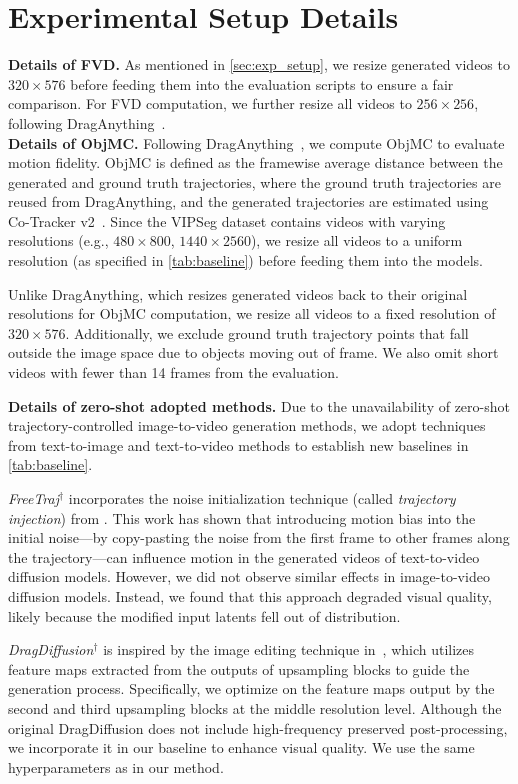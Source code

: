 \section{Experimental Setup Details}
\textbf{Details of FVD.} As mentioned in \cref{sec:exp_setup}, we resize generated videos to $320 \times 576$ before feeding them into the evaluation scripts to ensure a fair comparison. For FVD computation, we further resize all videos to $256 \times 256$, following DragAnything~\citep{wu2024draganything}.\\

\textbf{Details of ObjMC.} Following DragAnything~\citep{wu2024draganything}, we compute ObjMC to evaluate motion fidelity. ObjMC is defined as the framewise average distance between the generated and ground truth trajectories, where the ground truth trajectories are reused from DragAnything, and the generated trajectories are estimated using Co-Tracker v2~\citep{cotracker}. Since the VIPSeg dataset contains videos with varying resolutions (e.g., $480 \times 800$, $1440 \times 2560$), we resize all videos to a uniform resolution (as specified in \cref{tab:baseline}) before feeding them into the models.

Unlike DragAnything, which resizes generated videos back to their original resolutions for ObjMC computation, we resize all videos to a fixed resolution of $320 \times 576$. Additionally, we exclude ground truth trajectory points that fall outside the image space due to objects moving out of frame. We also omit short videos with fewer than 14 frames from the evaluation.

\textbf{Details of zero-shot adopted methods.} Due to the unavailability of zero-shot trajectory-controlled image-to-video generation methods, we adopt techniques from text-to-image and text-to-video methods to establish new baselines in \cref{tab:baseline}.

\textit{FreeTraj$^\dagger$} incorporates the noise initialization technique (called \textit{trajectory injection}) from \citep{qiu2024freetraj}. This work has shown that introducing motion bias into the initial noise—by copy-pasting the noise from the first frame to other frames along the trajectory—can influence motion in the generated videos of text-to-video diffusion models. However, we did not observe similar effects in image-to-video diffusion models. Instead, we found that this approach degraded visual quality, likely because the modified input latents fell out of distribution.

\textit{DragDiffusion$^\dagger$} is inspired by the image editing technique in~\citep{shi2024dragdiffusion}, which utilizes feature maps extracted from the outputs of upsampling blocks to guide the generation process. Specifically, we optimize on the feature maps output by the second and third upsampling blocks at the middle resolution level. Although the original DragDiffusion does not include high-frequency preserved post-processing, we incorporate it in our baseline to enhance visual quality. We use the same hyperparameters as in our method.

